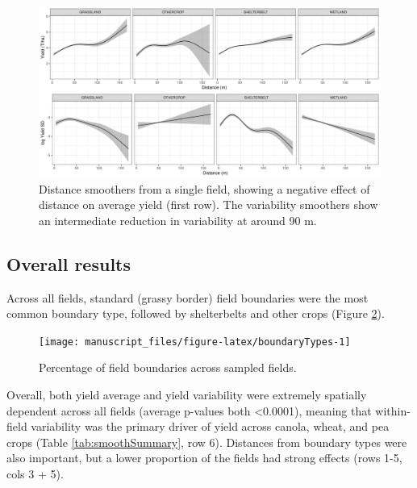 \documentclass[]{elsarticle} %
\begin{document}
\begin{figure}
\includegraphics[width=1\linewidth]{../Figures/ExamplePlots/distSmooths} \caption{Distance smoothers from a single field, showing a negative effect of distance on average yield (first row). The variability smoothers show an intermediate reduction in variability at around 90 m.}\label{fig:distSmooths}
\end{figure}

\hypertarget{overall-results}{%
\subsection{Overall results}\label{overall-results}}

Across all fields, standard (grassy border) field boundaries were the most common boundary type, followed by shelterbelts and other crops (Figure \ref{fig:boundaryTypes}).

\begin{figure}
\texttt{[image: manuscript\_files/figure-latex/boundaryTypes-1]} \caption{Percentage of field boundaries across sampled fields.}\label{fig:boundaryTypes}
\end{figure}

Overall, both yield average and yield variability were extremely spatially dependent across all fields (average p-values both \textless0.0001), meaning that within-field variability was the primary driver of yield across canola, wheat, and pea crops (Table \ref{tab:smoothSummary}, row 6).
Distances from boundary types were also important, but a lower proportion of the fields had strong effects (rows 1-5, cols 3 + 5).
\end{document}
